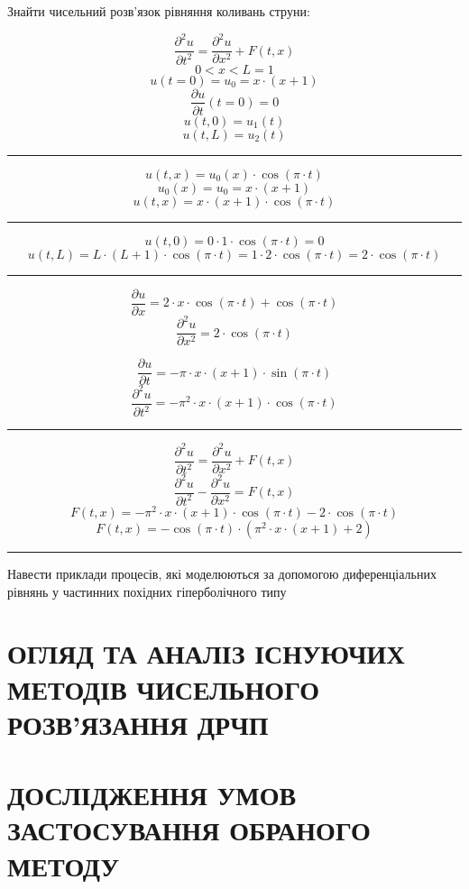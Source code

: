 \documentclass{article}
\begin{document}
    Знайти чисельний розв’язок рівняння коливань струни:

    $$ \frac{\partial^2{u}}{\partial{t^2}} = \frac{\partial^2{u}}{\partial{x^2}} + F(t, x) $$
    $$ 0 < x < L = 1 $$
    $$ u(t = 0) = u_0 = x \cdot (x+1) $$
    $$ \frac{\partial{u}}{\partial{t}}(t = 0) = 0 $$
    $$ u(t, 0) = u_1(t) $$
    $$ u(t, L) = u_2(t) $$

    \hrule

    $$ u(t,x) = u_0(x) \cdot \cos(\pi \cdot t) $$
    $$ u_0(x) = u_0 = x \cdot (x+1) $$
    $$ u(t,x) = x \cdot (x+1) \cdot \cos(\pi \cdot t) $$

    \hrule

    $$ u(t,0) = 0 \cdot 1 \cdot \cos(\pi \cdot t) = 0 $$
    $$ u(t, L) = L \cdot (L+1) \cdot \cos(\pi \cdot t) = 1 \cdot 2 \cdot \cos(\pi \cdot t) = 2 \cdot \cos(\pi \cdot t) $$

    \hrule

    $$ \frac{\partial{u}}{\partial{x}} = 2 \cdot x \cdot \cos(\pi \cdot t) + \cos(\pi \cdot t) $$
    $$ \frac{\partial^2{u}}{\partial{x^2}} = 2 \cdot \cos(\pi \cdot t) $$

    $$ \frac{\partial{u}}{\partial{t}} = -\pi \cdot x \cdot (x+1) \cdot \sin(\pi \cdot t) $$
    $$ \frac{\partial^2{u}}{\partial{t^2}} = -\pi^2 \cdot x \cdot (x+1) \cdot \cos(\pi \cdot t) $$

    \hrule

    $$ \frac{\partial^2{u}}{\partial{t^2}} = \frac{\partial^2{u}}{\partial{x^2}} + F(t, x) $$
    $$ \frac{\partial^2{u}}{\partial{t^2}} - \frac{\partial^2{u}}{\partial{x^2}} = F(t, x) $$
    $$ F(t, x) = -\pi^2 \cdot x \cdot (x+1) \cdot \cos(\pi \cdot t) - 2 \cdot \cos(\pi \cdot t) $$
    $$ F(t, x) = -\cos(\pi \cdot t) \cdot \left(\pi^2 \cdot x \cdot (x+1) + 2\right) $$

    \hrule

    Навести приклади процесів, які моделюються за допомогою диференціальних рівнянь у частинних похідних гіперболічного типу
    
    \newpage
    \section{ОГЛЯД ТА АНАЛІЗ ІСНУЮЧИХ МЕТОДІВ ЧИСЕЛЬНОГО РОЗВ’ЯЗАННЯ ДРЧП}
    \newpage
    \section{ДОСЛІДЖЕННЯ УМОВ ЗАСТОСУВАННЯ ОБРАНОГО МЕТОДУ}
\end{document}
